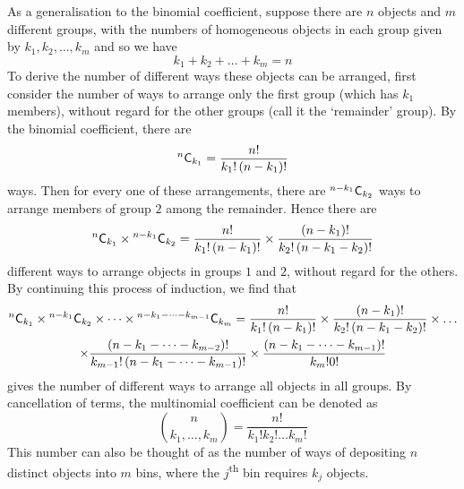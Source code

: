 \documentclass[11pt]{report} %
\begin{document}
As a generalisation to the binomial coefficient, suppose there are $n$ objects and $m$ different groups, with the numbers of homogeneous objects in each group given by $k_{1}, k_{2}, \dots, k_{m}$ and so we have
\begin{equation}
k_{1} + k_{2} + \dots + k_{m} = n
\end{equation}
To derive the number of different ways these objects can be arranged, first consider the number of ways to arrange only the first group (which has $k_{1}$ members), without regard for the other groups (call it the `remainder' group). By the binomial coefficient, there are
\begin{equation}
\mathstrut^{n}\mathsf{C}_{k_{1}} = \dfrac{n!}{k_{1}!\left(n - k_{1}\right)!}
\end{equation}
ways. Then for every one of these arrangements, there are $\mathstrut^{n - k_{1}}\mathsf{C}_{k_{2}}$ ways to arrange members of group $2$ among the remainder. Hence there are
\begin{equation}
\mathstrut^{n}\mathsf{C}_{k_{1}}\times\mathstrut^{n - k_{1}}\mathsf{C}_{k_{2}} = \dfrac{n!}{k_{1}!\left(n - k_{1}\right)!}\times\dfrac{\left(n - k_{1}\right)!}{k_{2}!\left(n - k_{1} - k_{2}\right)!}
\end{equation}
different ways to arrange objects in groups $1$ and $2$, without regard for the others. By continuing this process of induction, we find that
\begin{multline}
\mathstrut^{n}\mathsf{C}_{k_{1}}\times\mathstrut^{n - k_{1}}\mathsf{C}_{k_{2}}\times\dots\times\mathstrut^{n - k_{1} - \dots - k_{m - 1}}\mathsf{C}_{k_{m}} = \dfrac{n!}{k_{1}!\left(n - k_{1}\right)!}\times\dfrac{\left(n - k_{1}\right)!}{k_{2}!\left(n - k_{1} - k_{2}\right)!}\times\dots \\
\times \dfrac{\left(n - k_{1} - \dots - k_{m - 2}\right)!}{k_{m - 1}!\left(n - k_{1} - \dots - k_{m - 1}\right)!}\times\dfrac{\left(n - k_{1} - \dots - k_{m - 1}\right)!}{k_{m}!0!}
\end{multline}
gives the number of different ways to arrange all objects in all groups. By cancellation of terms, the multinomial coefficient can be denoted as
\begin{equation}
\binom{n}{k_{1}, \dots, k_{m}} = \dfrac{n!}{k_{1}!k_{2}!\dots k_{m}!}
\end{equation}
This number can also be thought of as the number of ways of depositing $n$ distinct objects into $m$ bins, where the $j$\textsuperscript{th} bin requires $k_{j}$ objects.
\end{document}
